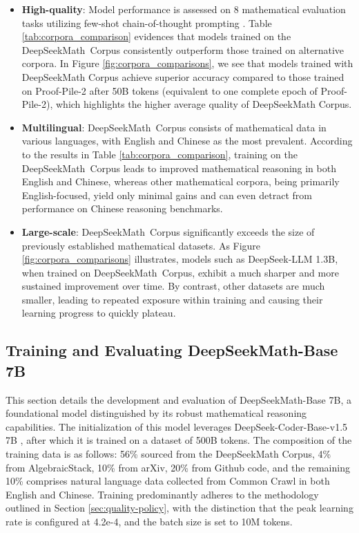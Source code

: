 \begin{itemize}[topsep=0pt]
    \item \textbf{High-quality}:
    Model performance is assessed on 8 mathematical evaluation tasks utilizing few-shot chain-of-thought prompting \cite{cot}. Table \ref{tab:corpora_comparison} evidences that models trained on the DeepSeekMath~Corpus consistently outperform those trained on alternative corpora. In Figure \ref{fig:corpora_comparisons}, we see that models trained with DeepSeekMath Corpus achieve superior accuracy compared to those trained on Proof-Pile-2 after 50B tokens (equivalent to one complete epoch of Proof-Pile-2), which highlights the higher average quality of DeepSeekMath Corpus.
    \item \textbf{Multilingual}:
    DeepSeekMath~Corpus consists of mathematical data in various languages, with English and Chinese as the most prevalent. According to the results in Table \ref{tab:corpora_comparison}, training on the DeepSeekMath~Corpus leads to improved mathematical reasoning in both English and Chinese, whereas other mathematical corpora, being primarily English-focused, yield only minimal gains and can even detract from performance on Chinese reasoning benchmarks.
    \item \textbf{Large-scale}:
    DeepSeekMath~Corpus significantly exceeds the size of previously established mathematical datasets. As Figure \ref{fig:corpora_comparisons} illustrates, models such as DeepSeek-LLM 1.3B, when trained on DeepSeekMath~Corpus, exhibit a much sharper and more sustained improvement over time. By contrast, other datasets are much smaller, leading to repeated exposure within training and causing their learning progress to quickly plateau.
\end{itemize}

\subsection{Training and Evaluating DeepSeekMath-Base 7B}

This section details the development and evaluation of DeepSeekMath-Base 7B, a foundational model distinguished by its robust mathematical reasoning capabilities. The initialization of this model leverages DeepSeek-Coder-Base-v1.5 7B \citep{deepseek-coder}, after which it is trained on a dataset of 500B tokens. The composition of the training data is as follows: 56\% sourced from the DeepSeekMath Corpus, 4\% from AlgebraicStack, 10\% from arXiv, 20\% from Github code, and the remaining 10\% comprises natural language data collected from Common Crawl in both English and Chinese. Training predominantly adheres to the methodology outlined in Section \ref{sec:quality-policy}, with the distinction that the peak learning rate is configured at 4.2e-4, and the batch size is set to 10M tokens.

